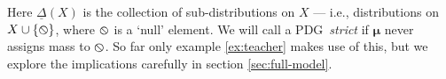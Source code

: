 \documentclass{article}
\newcommand{\none}{\varobslash}
\newcommand\bmu{\boldsymbol{\mu}}
\newcommand{\V}{\mathcal V}
\newcommand{\N}{\mathcal N}
\newcommand{\Li}{\mathcal L}
\newcommand{\modelnamehyper}{probabilistic dependency hypergraph}
\newcommand{\MN}{PDG}
\newcommand{\MNH}{PDH}
\begin{document}
	
	Here $\underline\Delta(X)$ is the collection of sub-distributions on $X$ --- i.e., distributions on $X \cup \{\none\}$, where $\none$ is a `null' element. We will call a \MN\ \emph{strict} if $\bmu$ never assigns mass to $\none$. So far only example \ref{ex:teacher} makes use of this, but we explore the implications carefully in section \ref{sec:full-model}.
	
%
\end{document}
